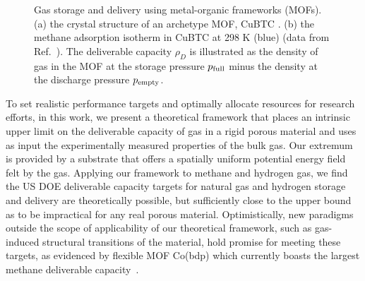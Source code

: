 \begin{figure}
    \centering
    \qquad
    \caption{Gas storage and delivery using metal-organic frameworks (MOFs). (a) the crystal structure of an archetype MOF, CuBTC \cite{chui1999chemically}. (b) the methane adsorption isotherm in CuBTC \cite{chui1999chemically} at 298 K (blue) (data from Ref.~\cite{mason2014evaluating}). The deliverable capacity $\rho_D$ is illustrated as the density of gas in the MOF at the storage pressure $p_{\text{full}}$ minus the density at the discharge pressure $p_{\text{empty}}$.
    }
    \label{fig:fig1}
\end{figure}

To set realistic performance targets and optimally allocate resources for research efforts, in this work, we present a theoretical framework that places an intrinsic upper limit on the deliverable capacity of gas in a rigid porous material and uses as input the experimentally measured properties of the bulk gas. Our extremum is provided by a substrate that offers a spatially uniform potential energy field felt by the gas. Applying our framework to methane and hydrogen gas, we find the US DOE deliverable capacity targets for natural gas and hydrogen storage and delivery are theoretically possible, but sufficiently close to the upper bound as to be impractical for any real porous material. Optimistically, new paradigms outside the scope of applicability of our theoretical framework, such as gas-induced structural transitions of the material, hold promise for meeting these targets, as evidenced by flexible MOF Co(bdp) which currently boasts the largest methane deliverable capacity~\cite{mason2015methane}.


